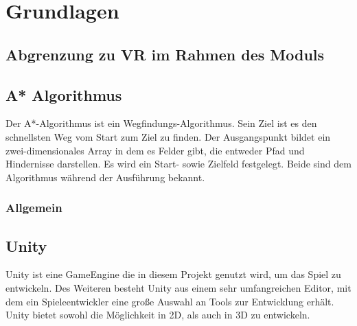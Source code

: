 \chapter{Grundlagen}
\section{Abgrenzung zu VR im Rahmen des Moduls}
\section{A* Algorithmus}
Der A*-Algorithmus ist ein Wegfindungs-Algorithmus. Sein Ziel ist es den schnellsten Weg vom Start zum Ziel zu finden. Der Ausgangspunkt bildet ein zwei-dimensionales Array in dem es Felder gibt, die entweder Pfad und Hindernisse darstellen. Es wird ein Start- sowie Zielfeld festgelegt. Beide sind dem Algorithmus während der Ausführung bekannt.
\subsection{Allgemein}

\label{sec:fundamentals}
\section{Unity}
Unity ist eine GameEngine die in diesem Projekt genutzt wird, um das Spiel zu entwickeln. Des Weiteren besteht Unity aus einem sehr umfangreichen Editor, mit dem ein Spieleentwickler eine große Auswahl an Tools zur Entwicklung erh\"alt. Unity bietet sowohl die M\"oglichkeit in 2D, als auch in 3D zu entwickeln.
